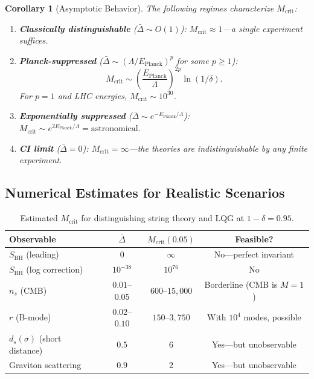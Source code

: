 \documentclass[12pt,a4paper]{article}
\newtheorem{corollary}[theorem]{Corollary}
\theoremstyle{remark}
\begin{document}
\begin{corollary}[Asymptotic Behavior]
\label{cor:m_crit_asymptotic}
The following regimes characterize $M_{\text{crit}}$:
\begin{enumerate}[label=(\roman*), leftmargin=*]
  \item \textbf{Classically distinguishable} ($\bar{\Delta} \sim O(1)$): $M_{\text{crit}} \approx 1$---a single experiment suffices.
  \item \textbf{Planck-suppressed} ($\bar{\Delta} \sim (\Lambda/E_{\text{Planck}})^p$ for some $p \geq 1$):
  \begin{equation}
    M_{\text{crit}} \sim \left(\frac{E_{\text{Planck}}}{\Lambda}\right)^{2p} \ln(1/\delta).
  \end{equation}
  For $p = 1$ and LHC energies, $M_{\text{crit}} \sim 10^{30}$.
  \item \textbf{Exponentially suppressed} ($\bar{\Delta} \sim e^{-E_{\text{Planck}}/\Lambda}$): $M_{\text{crit}} \sim e^{2E_{\text{Planck}}/\Lambda} = \text{astronomical}$.
  \item \textbf{CI limit} ($\bar{\Delta} = 0$): $M_{\text{crit}} = \infty$---the theories are indistinguishable by any finite experiment.
\end{enumerate}
\end{corollary}

\subsection{Numerical Estimates for Realistic Scenarios}

\begin{table}[H]
\centering
\caption{Estimated $M_{\text{crit}}$ for distinguishing string theory and LQG at $1 - \delta = 0.95$.}
\label{tab:mcrit_estimates}
\begin{tabular}{@{}lccc@{}}
\toprule
\textbf{Observable} & $\bar{\Delta}$ & $M_{\text{crit}}(0.05)$ & \textbf{Feasible?} \\
\midrule
$S_{\text{BH}}$ (leading) & $0$ & $\infty$ & No---perfect invariant \\
$S_{\text{BH}}$ (log correction) & $10^{-38}$ & $10^{76}$ & No \\
$n_s$ (CMB) & $0.01$--$0.05$ & $600$--$15{,}000$ & Borderline (CMB is $M=1$) \\
$r$ (B-mode) & $0.02$--$0.10$ & $150$--$3{,}750$ & With $10^4$ modes, possible \\
$d_s(\sigma)$ (short distance) & $0.5$ & $6$ & Yes---but unobservable \\
Graviton scattering & $0.9$ & $2$ & Yes---but unobservable \\
\bottomrule
\end{tabular}
\end{table}
\end{document}
